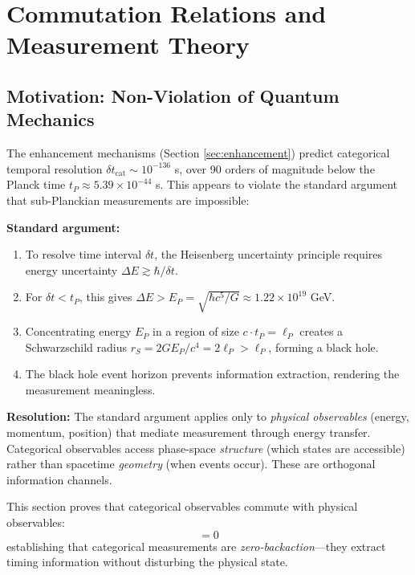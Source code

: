 \documentclass[twocolumn,10pt]{article}
\theoremstyle{remark}
\begin{document}
\section{Commutation Relations and Measurement Theory}
\label{sec:commutation}

\subsection{Motivation: Non-Violation of Quantum Mechanics}

The enhancement mechanisms (Section \ref{sec:enhancement}) predict categorical temporal resolution $\delta t_{\text{cat}} \sim 10^{-136}$ s, over 90 orders of magnitude below the Planck time $t_P \approx 5.39 \times 10^{-44}$ s. This appears to violate the standard argument that sub-Planckian measurements are impossible:

\textbf{Standard argument:}
\begin{enumerate}
    \item To resolve time interval $\delta t$, the Heisenberg uncertainty principle requires energy uncertainty $\Delta E \gtrsim \hbar/\delta t$.
    \item For $\delta t < t_P$, this gives $\Delta E > E_P = \sqrt{\hbar c^5/G} \approx 1.22 \times 10^{19}$ GeV.
    \item Concentrating energy $E_P$ in a region of size $c \cdot t_P = \ell_P$ creates a Schwarzschild radius $r_S = 2GE_P/c^4 = 2\ell_P > \ell_P$, forming a black hole.
    \item The black hole event horizon prevents information extraction, rendering the measurement meaningless.
\end{enumerate}

\textbf{Resolution:} The standard argument applies only to \textit{physical observables} (energy, momentum, position) that mediate measurement through energy transfer. Categorical observables access phase-space \textit{structure} (which states are accessible) rather than spacetime \textit{geometry} (when events occur). These are orthogonal information channels.

This section proves that categorical observables commute with physical observables:
\begin{equation}
    [\hat{O}_{\text{cat}}, \hat{O}_{\text{phys}}] = 0
    \label{eq:commutation_preview}
\end{equation}
establishing that categorical measurements are \textit{zero-backaction}—they extract timing information without disturbing the physical state.
\end{document}
